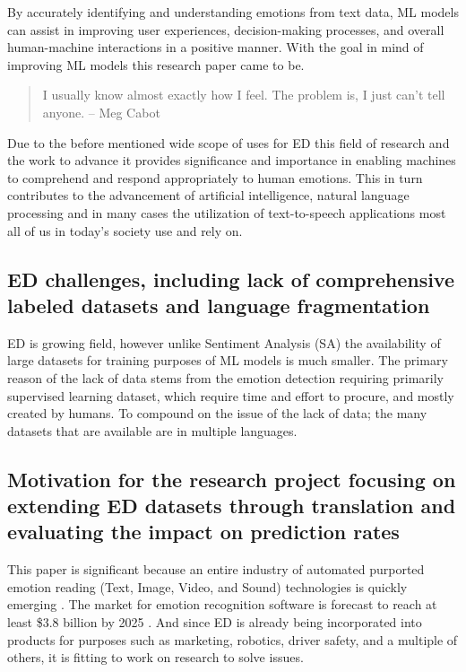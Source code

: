 \documentclass[11pt]{article}
\begin{document}
By accurately identifying and understanding emotions from text data, ML models can assist in improving user experiences, decision-making processes, and overall human-machine interactions in a positive manner\cite{Colonnello, mascarell-etal-2021-stance}. With the goal in mind of improving ML models this research paper came to be.

\begin{quote}
    I usually know almost exactly how I feel. The problem is, I just can’t tell anyone.
    \flushright -- Meg Cabot
\end{quote}

Due to the before mentioned wide scope of uses for ED this field of research and the work to advance it provides significance and importance in enabling machines to comprehend and respond appropriately to human emotions. This in turn contributes to the advancement of artificial intelligence, natural language processing and in many cases the utilization of text-to-speech applications most all of us in today's society use and rely on.

\subsection{ED challenges, including lack of comprehensive labeled datasets and language fragmentation}
ED is growing field, however unlike Sentiment Analysis (SA) the availability of large datasets for training purposes of ML models is much smaller. The primary reason of the lack of data stems from the emotion detection requiring primarily supervised learning dataset, which require time and effort to procure, and mostly created by humans. To compound on the issue of the lack of data; the many datasets that are available are in multiple languages.

\subsection{Motivation for the research project focusing on extending ED datasets through translation and evaluating the impact on prediction rates}

This paper is significant because an entire industry of automated purported emotion reading (Text, Image, Video, and Sound) technologies is quickly emerging \cite{ACLU-ED-Data, ACLU-THE-DAWN-OF-ROBOT-SURVEILLANCE}. The market for emotion recognition software is forecast to reach at least \$3.8 billion by 2025 \cite{ACLU-ED-Data, ACLU-THE-DAWN-OF-ROBOT-SURVEILLANCE}. And since ED is already being incorporated into products for purposes such as marketing, robotics, driver safety, and a multiple of others, it is fitting to work on research to solve issues.
\end{document}

